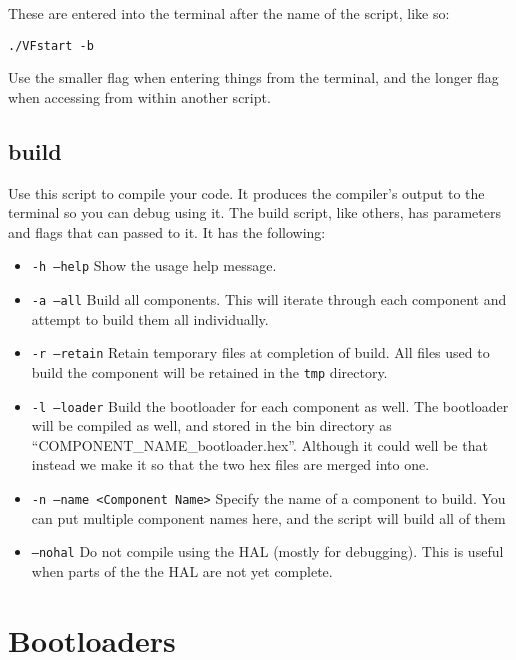 \documentclass[a4paper, oneside, 11pt, titlepage, onecolumn, openright]{article}
\begin{document}
These are entered into the terminal after the name of the script, like so:
\begin{lstlisting}
./VFstart -b
\end{lstlisting}

			Use the smaller flag when entering things from the terminal, and the longer flag when accessing from within another script.
			
	\subsection{build}
			\label{ss:build}
			Use this script to compile your code. It produces the compiler's output to the terminal so you can debug using it. 
			The build script, like others, has parameters and flags that can passed to it. It has the following:
\begin{itemize}
\item \texttt{-h --help} Show the usage help message.
\item	\texttt{-a --all}			Build all components. This will iterate through each component and attempt to build them all individually.
\item	\texttt{-r --retain}			Retain temporary files at completion of build. All files used to build the component will be retained in the \texttt{tmp} directory.
\item	\texttt{-l --loader}			Build the bootloader for each component as well. The bootloader will be compiled as well, and stored in the bin directory as ``COMPONENT\_NAME\_bootloader.hex''. Although it could well be that instead we make it so that the two hex files are merged into one.
\item	\texttt{-n --name <Component Name>}	Specify the name of a component to build. You can put multiple component names here, and the script will build all of them
\item	   \texttt{--nohal}			Do not compile using the HAL (mostly for debugging). This is useful when parts of the the HAL are not yet complete.
\end{itemize} 			


\section{Bootloaders}
\label{bootloaders}
\end{document}

